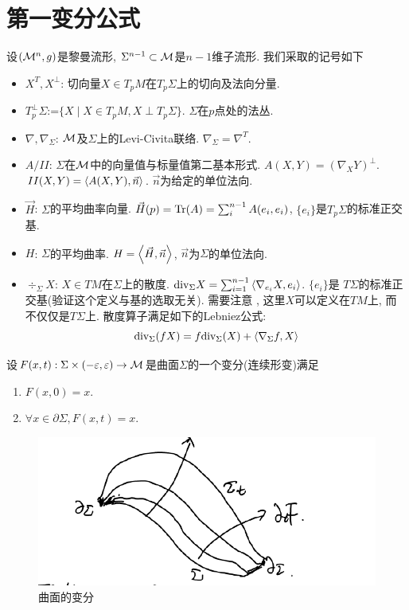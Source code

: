 \section{第一变分公式}
设$({\mathcal{M}}^n,g)$是黎曼流形, $\Sigma^{n-1}\subset {\mathcal{M}}$是$n-1$维子流形. 我们采取的记号如下
\begin{itemize}
    \item $X^T,X^\perp$: 切向量$X \in T_pM$在$T_p\Sigma$上的切向及法向分量.
    \item $T_p^\perp \Sigma$:=$\{X\mid X\in T_pM, X\perp T_p\Sigma\}$. $\Sigma$在$p$点处的法丛.
    \item $\nabla,\nabla_\Sigma$: ${\mathcal{M}}$及$\Sigma$上的Levi-Civita联络. $\nabla_\Sigma=\nabla^{T}$.
    \item $A/II$: $\Sigma$在${\mathcal{M}}$中的向量值与标量值第二基本形式. $A(X,Y)=(\nabla_XY)^\perp$. $II(X,Y)={\left < A(X,Y), \vec{n} \right >}$. $\vec{n}$为给定的单位法向.
    \item $\vec{H}$: $\Sigma$的平均曲率向量. $\vec{H}(p)=\text{Tr}(A)=\sum_{i}^{n-1}A(e_i,e_i)$, $\{e_i\}$是$T_p\Sigma$的标准正交基.
    \item ${H}$: $\Sigma$的平均曲率. $H={\left < \vec{H}, \vec{n} \right >}$, $\vec{n}$为$\Sigma$的单位法向.
    \item $\div_\Sigma X$: $X \in TM$在$\Sigma$上的散度. ${\text{div}}_\Sigma X=\sum_{i=1}^{n-1}{\left < \nabla_{e_i}X, e_i \right >}$. $\{e_i\}$是 $T\Sigma$的标准正交基(验证这个定义与基的选取无关). 需要注意 , 这里$X$可以定义在$TM$上, 而不仅仅是$T\Sigma$上. 散度算子满足如下的Lebniez公式:
    \begin{equation}
        {\text{div}}_\Sigma(fX)=f{\text{div}}_\Sigma(X)+{\left < \nabla_\Sigma f, X \right >}
    \end{equation}
\end{itemize}
设$F(x,t): \Sigma \times (-\varepsilon, \varepsilon) \to {\mathcal{M}}$是曲面$\Sigma$的一个变分(连续形变)满足
\begin{enumerate}
    \item $F(x,0)=x$.
    \item $\forall x \in \partial \Sigma, F(x,t)=x$.
\end{enumerate}

\begin{figure}[ht]
	\centering
	\includegraphics[scale=0.8]{images/variation.png}
	\caption{曲面的变分}
	\label{variation_p}
\end{figure}


